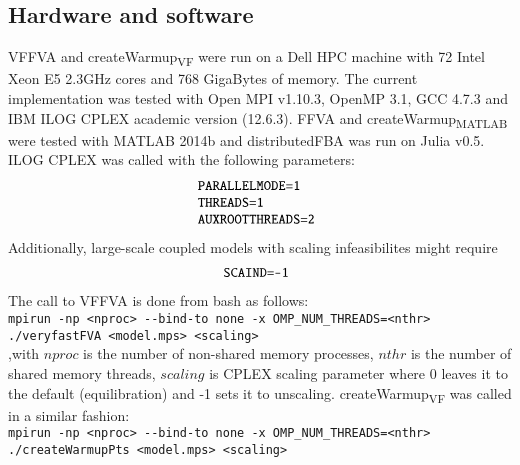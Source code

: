 \subsection*{Hardware and software}
VFFVA and createWarmup\textsubscript{VF} were run on a Dell HPC machine with 72 Intel Xeon E5 2.3GHz cores and 768 GigaBytes of memory. The current implementation was tested with Open MPI v1.10.3, OpenMP 3.1, GCC 4.7.3 and IBM ILOG CPLEX academic version (12.6.3). FFVA and createWarmup\textsubscript{MATLAB} were tested with MATLAB 2014b \cite{MATLAB:2014} and distributedFBA was run on Julia v0.5. ILOG CPLEX was called with the following parameters:
\begin{equation*} \label{eq:one}
\begin{array}{ll@{}ll}
\texttt{PARALLELMODE=1} &\\
\texttt{THREADS=1} &\\
\texttt{AUXROOTTHREADS=2} &\\
\end{array}
\end{equation*}
Additionally, large-scale coupled models with scaling infeasibilites might require 
\begin{equation*} \label{eq:one}
\begin{array}{ll@{}ll}
\texttt{SCAIND=-1} &\\
\end{array}
\end{equation*}
The call to VFFVA is done from bash as follows:\\
\texttt{mpirun -np \textless nproc\textgreater \hspace{0.1cm} -\hspace{0.05cm}-bind-to none -x OMP\_NUM\_THREADS=\textless nthr\textgreater \hspace{0.1cm} ./veryfastFVA \textless model.mps\textgreater \hspace{0.1cm} \textless scaling\textgreater}\\
,with $nproc$ is the number of non-shared memory processes, $nthr$ is the number of shared memory threads, $scaling$ is CPLEX scaling parameter where 0 leaves it to the default (equilibration) and -1 sets it to unscaling. createWarmup\textsubscript{VF} was called in a similar fashion:\\
\texttt{mpirun -np \textless nproc\textgreater \hspace{0.1cm}  -\hspace{0.05cm}-bind-to none -x OMP\_NUM\_THREADS=\textless nthr\textgreater \hspace{0.1cm}\\ ./createWarmupPts \textless model.mps\textgreater \hspace{0.1cm} \textless scaling\textgreater}\\
